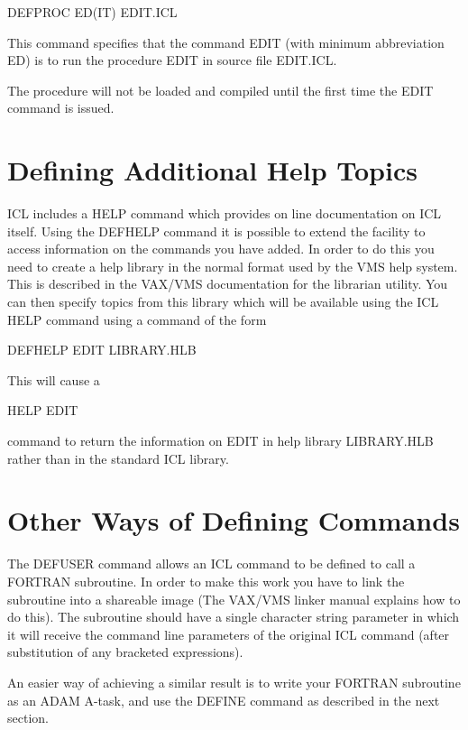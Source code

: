 \documentclass[twoside,11pt,nolof,chapters]{starlink}
\begin{document}
\begin{terminalv}
    DEFPROC ED(IT) EDIT.ICL
\end{terminalv}

This command specifies that the command EDIT (with minimum abbreviation
ED) is to run the procedure EDIT in source file EDIT.ICL.

The procedure will not be loaded and compiled until the first time the
EDIT command is issued.

\section{Defining Additional Help Topics}

ICL includes a HELP command which provides on line documentation on ICL
itself. Using the DEFHELP command it is possible to extend the facility
to access information on the commands you have added. In order to do this
you need to create a help library in the normal format used by the VMS
help system. This is described in the VAX/VMS documentation for the librarian
utility. You can then specify topics from this library which will be
available using the ICL HELP command using a command of the form
\begin{terminalv}
    DEFHELP  EDIT  LIBRARY.HLB
\end{terminalv}
This will cause a
\begin{terminalv}
    HELP EDIT
\end{terminalv}
command to return the information on EDIT in help library LIBRARY.HLB rather
than in the standard ICL library.

\section{Other Ways of Defining Commands}

The DEFUSER command allows an ICL command to be defined to call a FORTRAN
subroutine. In order to make this work you have to link the subroutine into
a shareable image (The VAX/VMS linker manual explains how to do this). The
subroutine should have a single character string parameter in which it will
receive the command line parameters of the original ICL command (after
substitution of any bracketed expressions).

An easier way of achieving a similar result is to write your FORTRAN
subroutine as an ADAM A-task, and use the DEFINE command as described in
the next section.
\end{document}
